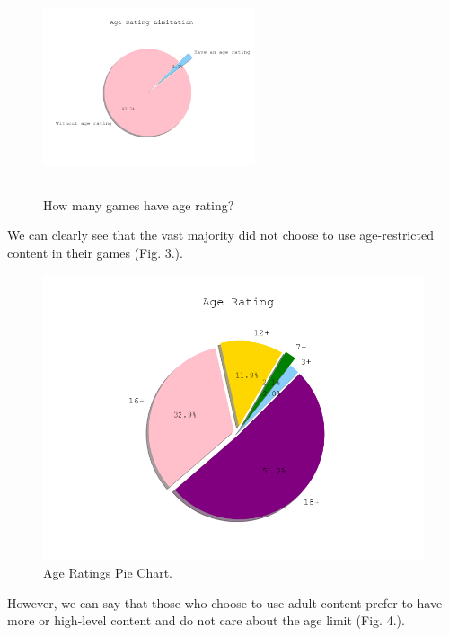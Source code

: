 \documentclass[conference]{IEEEtran}
\begin{document}
\begin{figure}[ht]
  \centering
  \includegraphics[width=6.25cm,height=6.25cm,keepaspectratio]{assets-1/age_rating_pie.png}
  \caption{How many games have age rating?}
  \label{fig:agerating1}
\end{figure}

We can clearly see that the vast majority did not choose to use age-restricted content in their games (Fig. 3.).

\begin{figure}[ht]
  \includegraphics[width=\linewidth]{assets-1/age_rating_has_pie.png}
  \caption{Age Ratings Pie Chart.}
  \label{fig:agerating2}
\end{figure}

However, we can say that those who choose to use adult content prefer to have more or high-level content and do not care about the age limit (Fig. 4.). 
\end{document}
